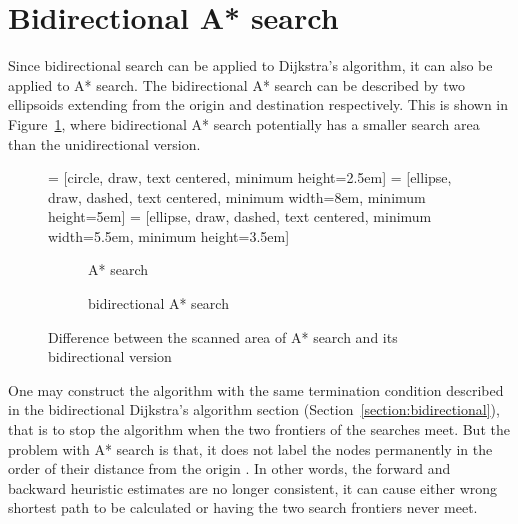 \section{Bidirectional A* search}
Since bidirectional search can be applied to Dijkstra's algorithm,
it can also be applied to A* search.
The bidirectional A* search can be described by two ellipsoids extending from the origin and destination respectively.
This is shown in Figure~\ref{fig:bidirectdiff},
where bidirectional A* search potentially has a smaller search area than the unidirectional version.

\begin{figure}[!ht]
     = [circle, draw, text centered, minimum height=2.5em]
     = [ellipse, draw, dashed, text centered, minimum width=8em, minimum height=5em]
     = [ellipse, draw, dashed, text centered, minimum width=5.5em, minimum height=3.5em]
    \centering
    \begin{subfigure}[t]{.4\textwidth}
        \centering
        \caption{A* search}
    \end{subfigure}
    \begin{subfigure}[t]{.4\textwidth}
        \centering
        \caption{bidirectional A* search}
    \end{subfigure}
    \caption{Difference between the scanned area of A* search and its bidirectional version}
    \label{fig:bidirectdiff}
\end{figure}

One may construct the algorithm with the same termination condition described in the bidirectional Dijkstra's algorithm section (Section~\ref{section:bidirectional}),
that is to stop the algorithm when the two frontiers of the searches meet.
But the problem with A* search is that, it does not label the nodes permanently in the order of their distance from the origin \citep{Klunder}.
In other words, the forward and backward heuristic estimates are no longer consistent,
it can cause either wrong shortest path to be calculated or having the two search frontiers never meet.

